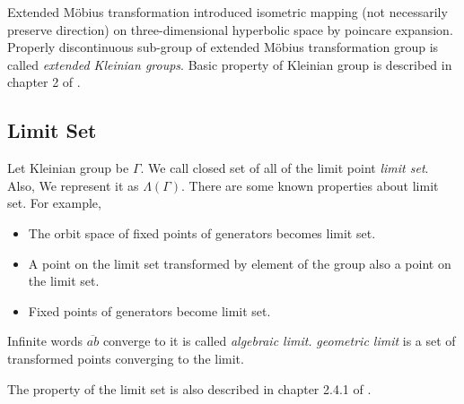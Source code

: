 Extended M\"obius transformation introduced isometric mapping (not
necessarily preserve direction) on three-dimensional hyperbolic space by
poincare expansion.
Properly discontinuous sub-group of extended M\"obius transformation group
is called \textit{extended Kleinian groups}.
Basic property of Kleinian group is described in chapter 2 of \cite{marden_2016}.

\subsection{Limit Set}

Let Kleinian group be $\Gamma$.
We call closed set of all of the limit point \textit{limit set}.
Also, We represent it as $\Lambda(\Gamma)$.
There are some known properties about limit set.
For example,
\begin{itemize}
 \item The orbit space of fixed points of generators becomes limit set.
 \item A point on the limit set transformed by element of the group 
       also a point on the limit set.
 \item Fixed points of generators become limit set.
\end{itemize}

Infinite words $\overline{ab}$ converge to it is called \textit{algebraic limit.}
\textit{geometric limit} is a set of transformed points converging to
the limit.

The property of the limit set is also described in chapter 2.4.1 of
\cite{marden_2016}.



